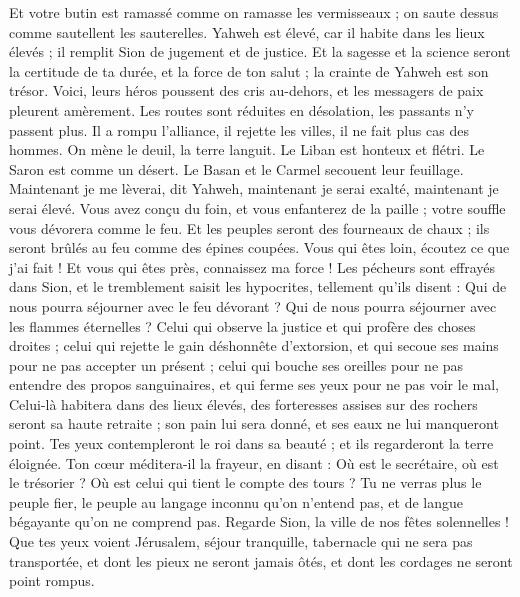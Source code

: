 \begin{multicols}{2}
Et votre butin est ramassé comme on ramasse les vermisseaux ; on saute dessus comme sautellent les sauterelles.
Yahweh est élevé, car il habite dans les lieux élevés ; il remplit Sion de jugement et de justice.
Et la sagesse et la science seront la certitude de ta durée, et la force de ton salut ; la crainte de Yahweh est son trésor.
Voici, leurs héros poussent des cris au-dehors, et les messagers de paix pleurent amèrement.
Les routes sont réduites en désolation, les passants n'y passent plus. Il a rompu l'alliance, il rejette les villes, il ne fait plus cas des hommes.
On mène le deuil, la terre languit. Le Liban est honteux et flétri. Le Saron est comme un désert. Le Basan et le Carmel secouent leur feuillage.
Maintenant je me lèverai, dit Yahweh, maintenant je serai exalté, maintenant je serai élevé.
Vous avez conçu du foin, et vous enfanterez de la paille ; votre souffle vous dévorera comme le feu.
Et les peuples seront des fourneaux de chaux ; ils seront brûlés au feu comme des épines coupées.
Vous qui êtes loin, écoutez ce que j'ai fait ! Et vous qui êtes près, connaissez ma force !
Les pécheurs sont effrayés dans Sion, et le tremblement saisit les hypocrites, tellement qu'ils disent : Qui de nous pourra séjourner avec le feu dévorant ? Qui de nous pourra séjourner avec les flammes éternelles ?
Celui qui observe la justice et qui profère des choses droites ; celui qui rejette le gain déshonnête d'extorsion, et qui secoue ses mains pour ne pas accepter un présent ; celui qui bouche ses oreilles pour ne pas entendre des propos sanguinaires, et qui ferme ses yeux pour ne pas voir le mal,
Celui-là habitera dans des lieux élevés, des forteresses assises sur des rochers seront sa haute retraite ; son pain lui sera donné, et ses eaux ne lui manqueront point.
Tes yeux contempleront le roi dans sa beauté ; et ils regarderont la terre éloignée.
Ton cœur méditera-il la frayeur, en disant : Où est le secrétaire, où est le trésorier ? Où est celui qui tient le compte des tours ?
Tu ne verras plus le peuple fier, le peuple au langage inconnu qu'on n'entend pas, et de langue bégayante qu'on ne comprend pas.
Regarde Sion, la ville de nos fêtes solennelles ! Que tes yeux voient Jérusalem, séjour tranquille, tabernacle qui ne sera pas transportée, et dont les pieux ne seront jamais ôtés, et dont les cordages ne seront point rompus.

\end{multicols}
